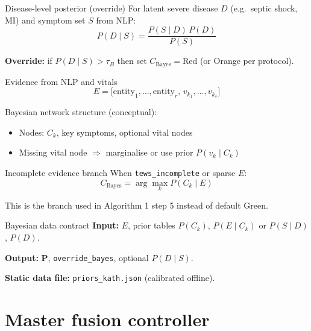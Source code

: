 \documentclass[aspectratio=169,11pt]{beamer}
\begin{document}
\begin{frame}{Disease-level posterior (override)}
	For latent severe disease $D$ (e.g.\ septic shock, MI) and symptom set $S$ from NLP:
	\[
	P(D \mid S) = \frac{P(S \mid D)\, P(D)}{P(S)}
	\]

	\textbf{Override:} if $P(D\mid S) > \tau_B$ then set $C_{\text{Bayes}} = \text{Red}$ (or Orange per protocol).
\end{frame}

\begin{frame}{Evidence from NLP and vitals}
	\[
	E = \bigl[\text{entity}_1,\ldots,\text{entity}_r,\, v_{k_1},\ldots,v_{k_s}\bigr]
	\]

	Bayesian network structure (conceptual):
	\begin{itemize}
		\item Nodes: $C_k$, key symptoms, optional vital nodes
		\item Missing vital node $\Rightarrow$ marginalise or use prior $P(v_k\mid C_k)$
	\end{itemize}
\end{frame}

\begin{frame}{Incomplete evidence branch}
	When \texttt{tews\_incomplete} or sparse $E$:
	\[
	C_{\text{Bayes}} = \arg\max_{k} P(C_k \mid E)
	\]

	This is the branch used in Algorithm 1 step 5 instead of default Green.
\end{frame}

\begin{frame}{Bayesian data contract}
	\textbf{Input:} $E$, prior tables $P(C_k)$, $P(E\mid C_k)$ or $P(S\mid D)$, $P(D)$.

	\textbf{Output:} $\mathbf{P}$, \texttt{override\_bayes}, optional $P(D\mid S)$.

	\textbf{Static data file:} \texttt{priors\_kath.json} (calibrated offline).
\end{frame}

\section{Master fusion controller}
\end{document}
